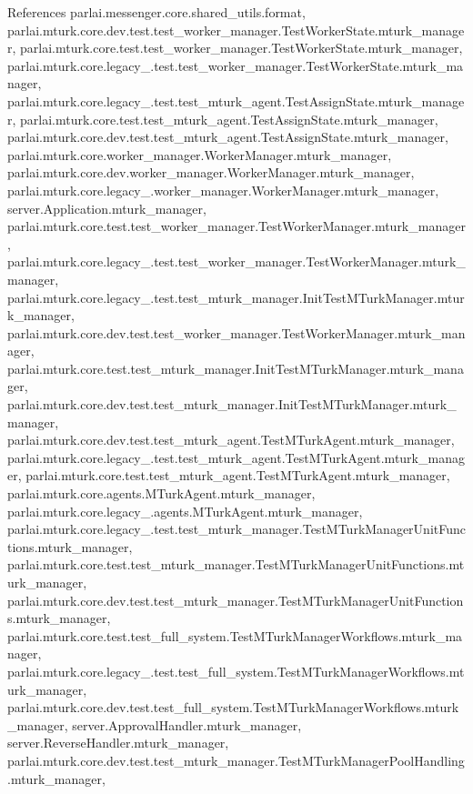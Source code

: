 References parlai.\+messenger.\+core.\+shared\+\_\+utils.\+format, parlai.\+mturk.\+core.\+dev.\+test.\+test\+\_\+worker\+\_\+manager.\+Test\+Worker\+State.\+mturk\+\_\+manager, parlai.\+mturk.\+core.\+test.\+test\+\_\+worker\+\_\+manager.\+Test\+Worker\+State.\+mturk\+\_\+manager, parlai.\+mturk.\+core.\+legacy\+\_.\+test.\+test\+\_\+worker\+\_\+manager.\+Test\+Worker\+State.\+mturk\+\_\+manager, parlai.\+mturk.\+core.\+legacy\+\_.\+test.\+test\+\_\+mturk\+\_\+agent.\+Test\+Assign\+State.\+mturk\+\_\+manager, parlai.\+mturk.\+core.\+test.\+test\+\_\+mturk\+\_\+agent.\+Test\+Assign\+State.\+mturk\+\_\+manager, parlai.\+mturk.\+core.\+dev.\+test.\+test\+\_\+mturk\+\_\+agent.\+Test\+Assign\+State.\+mturk\+\_\+manager, parlai.\+mturk.\+core.\+worker\+\_\+manager.\+Worker\+Manager.\+mturk\+\_\+manager, parlai.\+mturk.\+core.\+dev.\+worker\+\_\+manager.\+Worker\+Manager.\+mturk\+\_\+manager, parlai.\+mturk.\+core.\+legacy\+\_.\+worker\+\_\+manager.\+Worker\+Manager.\+mturk\+\_\+manager, server.\+Application.\+mturk\+\_\+manager, parlai.\+mturk.\+core.\+test.\+test\+\_\+worker\+\_\+manager.\+Test\+Worker\+Manager.\+mturk\+\_\+manager, parlai.\+mturk.\+core.\+legacy\+\_.\+test.\+test\+\_\+worker\+\_\+manager.\+Test\+Worker\+Manager.\+mturk\+\_\+manager, parlai.\+mturk.\+core.\+legacy\+\_.\+test.\+test\+\_\+mturk\+\_\+manager.\+Init\+Test\+M\+Turk\+Manager.\+mturk\+\_\+manager, parlai.\+mturk.\+core.\+dev.\+test.\+test\+\_\+worker\+\_\+manager.\+Test\+Worker\+Manager.\+mturk\+\_\+manager, parlai.\+mturk.\+core.\+test.\+test\+\_\+mturk\+\_\+manager.\+Init\+Test\+M\+Turk\+Manager.\+mturk\+\_\+manager, parlai.\+mturk.\+core.\+dev.\+test.\+test\+\_\+mturk\+\_\+manager.\+Init\+Test\+M\+Turk\+Manager.\+mturk\+\_\+manager, parlai.\+mturk.\+core.\+dev.\+test.\+test\+\_\+mturk\+\_\+agent.\+Test\+M\+Turk\+Agent.\+mturk\+\_\+manager, parlai.\+mturk.\+core.\+legacy\+\_.\+test.\+test\+\_\+mturk\+\_\+agent.\+Test\+M\+Turk\+Agent.\+mturk\+\_\+manager, parlai.\+mturk.\+core.\+test.\+test\+\_\+mturk\+\_\+agent.\+Test\+M\+Turk\+Agent.\+mturk\+\_\+manager, parlai.\+mturk.\+core.\+agents.\+M\+Turk\+Agent.\+mturk\+\_\+manager, parlai.\+mturk.\+core.\+legacy\+\_.\+agents.\+M\+Turk\+Agent.\+mturk\+\_\+manager, parlai.\+mturk.\+core.\+legacy\+\_.\+test.\+test\+\_\+mturk\+\_\+manager.\+Test\+M\+Turk\+Manager\+Unit\+Functions.\+mturk\+\_\+manager, parlai.\+mturk.\+core.\+test.\+test\+\_\+mturk\+\_\+manager.\+Test\+M\+Turk\+Manager\+Unit\+Functions.\+mturk\+\_\+manager, parlai.\+mturk.\+core.\+dev.\+test.\+test\+\_\+mturk\+\_\+manager.\+Test\+M\+Turk\+Manager\+Unit\+Functions.\+mturk\+\_\+manager, parlai.\+mturk.\+core.\+test.\+test\+\_\+full\+\_\+system.\+Test\+M\+Turk\+Manager\+Workflows.\+mturk\+\_\+manager, parlai.\+mturk.\+core.\+legacy\+\_.\+test.\+test\+\_\+full\+\_\+system.\+Test\+M\+Turk\+Manager\+Workflows.\+mturk\+\_\+manager, parlai.\+mturk.\+core.\+dev.\+test.\+test\+\_\+full\+\_\+system.\+Test\+M\+Turk\+Manager\+Workflows.\+mturk\+\_\+manager, server.\+Approval\+Handler.\+mturk\+\_\+manager, server.\+Reverse\+Handler.\+mturk\+\_\+manager, parlai.\+mturk.\+core.\+dev.\+test.\+test\+\_\+mturk\+\_\+manager.\+Test\+M\+Turk\+Manager\+Pool\+Handling.\+mturk\+\_\+manager, 